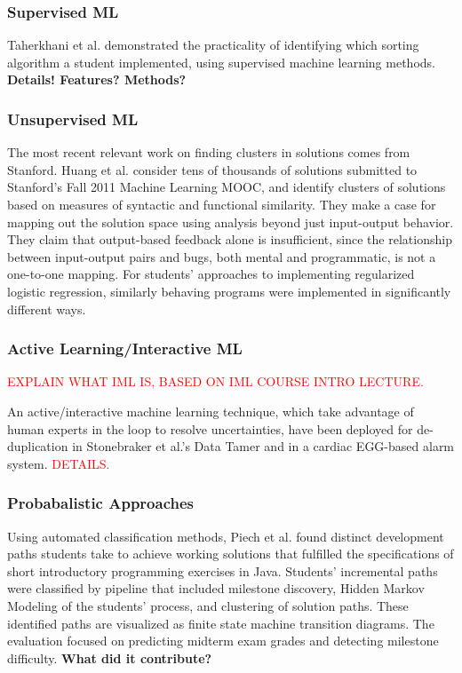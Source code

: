 \documentclass[12pt]{article}
\begin{document}
\subsubsection{Supervised ML}

Taherkhani et al. \cite{taherkhani12} demonstrated the practicality of identifying which sorting algorithm a student implemented, using supervised machine learning methods. \textbf{Details! Features? Methods?}

\subsubsection{Unsupervised ML}

The most recent relevant work on finding clusters in solutions comes from Stanford. Huang et al. \cite{MOOCshop} consider tens of thousands of solutions submitted to Stanford's Fall 2011 Machine Learning MOOC, and identify clusters of solutions based on measures of syntactic and functional similarity. They make a case for mapping out the solution space using analysis beyond just input-output behavior. They claim that output-based feedback alone is insufficient, since the relationship between input-output pairs and bugs, both mental and programmatic, is not a one-to-one mapping.  For students' approaches to implementing regularized logistic regression, similarly behaving programs were implemented in significantly different ways. 

\subsubsection{Active Learning/Interactive ML}

\textcolor{red}{EXPLAIN WHAT IML IS, BASED ON IML COURSE INTRO LECTURE.}

An active/interactive machine learning technique, which take advantage of human experts in the loop to resolve uncertainties, have been deployed for de-duplication in Stonebraker et al.'s Data Tamer \cite{stonebraker2013data} and in a cardiac EGG-based alarm system\cite{JWiensNIPS}. \textcolor{red}{DETAILS.}

\subsubsection{Probabalistic Approaches}

Using automated classification methods, Piech et al. \cite{Piech} found distinct development paths students take to achieve working solutions that fulfilled the specifications of short introductory programming exercises in Java. Students' incremental paths were classified by pipeline that included milestone discovery, Hidden Markov Modeling of the students' process, and clustering of solution paths. These identified paths are visualized as finite state machine transition diagrams. The evaluation focused on predicting midterm exam grades and detecting milestone difficulty. \textbf{What did it contribute?}
\end{document}
